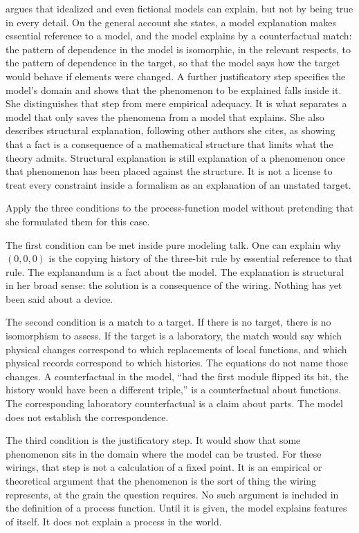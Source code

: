 \documentclass[12pt]{article}
\begin{document}
\citet{bokulich2011} argues that idealized and even fictional models can explain, but not by being true in every detail. On the general account she states, a model explanation makes essential reference to a model, and the model explains by a counterfactual match: the pattern of dependence in the model is isomorphic, in the relevant respects, to the pattern of dependence in the target, so that the model says how the target would behave if elements were changed. A further justificatory step specifies the model's domain and shows that the phenomenon to be explained falls inside it. She distinguishes that step from mere empirical adequacy. It is what separates a model that only saves the phenomena from a model that explains. She also describes structural explanation, following other authors she cites, as showing that a fact is a consequence of a mathematical structure that limits what the theory admits. Structural explanation is still explanation of a phenomenon once that phenomenon has been placed against the structure. It is not a license to treat every constraint inside a formalism as an explanation of an unstated target.

Apply the three conditions to the process-function model without pretending that she formulated them for this case.

The first condition can be met inside pure modeling talk. One can explain why \((0,0,0)\) is the copying history of the three-bit rule by essential reference to that rule. The explanandum is a fact about the model. The explanation is structural in her broad sense: the solution is a consequence of the wiring. Nothing has yet been said about a device.

The second condition is a match to a target. If there is no target, there is no isomorphism to assess. If the target is a laboratory, the match would say which physical changes correspond to which replacements of local functions, and which physical records correspond to which histories. The equations do not name those changes. A counterfactual in the model, ``had the first module flipped its bit, the history would have been a different triple,'' is a counterfactual about functions. The corresponding laboratory counterfactual is a claim about parts. The model does not establish the correspondence.

The third condition is the justificatory step. It would show that some phenomenon sits in the domain where the model can be trusted. For these wirings, that step is not a calculation of a fixed point. It is an empirical or theoretical argument that the phenomenon is the sort of thing the wiring represents, at the grain the question requires. No such argument is included in the definition of a process function. Until it is given, the model explains features of itself. It does not explain a process in the world.
\end{document}
